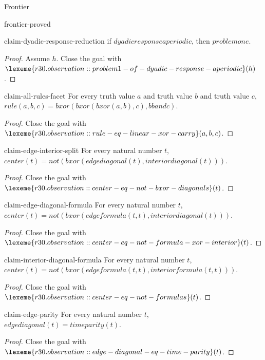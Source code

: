 \begin{lexlean}{Frontier}
\begin{section}{frontier-proved}
\begin{theorem}{claim-dyadic-response-reduction}
if \(dyadicresponseaperiodic\), then \(problemone\).
\begin{proof}
Assume \(h\).
Close the goal with \(\lexeme{r30.observation::problem1-of-dyadic-response-aperiodic}(h)\).
\end{proof}
\end{theorem}

\begin{theorem}{claim-all-rules-facet}
For every truth value \(a\) and truth value \(b\) and truth value \(c\), \(rule(a, b, c) = bxor(bxor(bxor(a, b), c), b band c)\).
\begin{proof}
Close the goal with \(\lexeme{r30.observation::rule-eq-linear-xor-carry}(a, b, c)\).
\end{proof}
\end{theorem}

\begin{theorem}{claim-edge-interior-split}
For every natural number \(t\), \(center(t) = not(bxor(edgediagonal(t), interiordiagonal(t)))\).
\begin{proof}
Close the goal with \(\lexeme{r30.observation::center-eq-not-bxor-diagonals}(t)\).
\end{proof}
\end{theorem}

\begin{theorem}{claim-edge-diagonal-formula}
For every natural number \(t\), \(center(t) = not(bxor(edgeformula(t, t), interiordiagonal(t)))\).
\begin{proof}
Close the goal with \(\lexeme{r30.observation::center-eq-not-formula-xor-interior}(t)\).
\end{proof}
\end{theorem}

\begin{theorem}{claim-interior-diagonal-formula}
For every natural number \(t\), \(center(t) = not(bxor(edgeformula(t, t), interiorformula(t, t)))\).
\begin{proof}
Close the goal with \(\lexeme{r30.observation::center-eq-not-formulas}(t)\).
\end{proof}
\end{theorem}

\begin{theorem}{claim-edge-parity}
For every natural number \(t\), \(edgediagonal(t) = timeparity(t)\).
\begin{proof}
Close the goal with \(\lexeme{r30.observation::edge-diagonal-eq-time-parity}(t)\).
\end{proof}
\end{theorem}


\end{section}
\end{lexlean}
